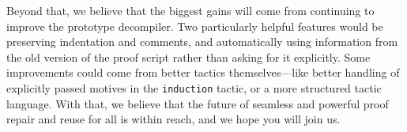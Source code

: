 Beyond that, we believe that the biggest gains will come from continuing to improve the prototype decompiler.
Two particularly helpful features would be preserving indentation and comments, and automatically using information from the old 
version of the proof script rather than asking for it explicitly.
Some improvements could come from better tactics themselves---like better handling of explicitly passed 
motives in the \lstinline{induction} tactic, or a more structured tactic language.
With that, we believe that the future of seamless and powerful proof repair and reuse for all is within reach,
and we hope you will join us.




